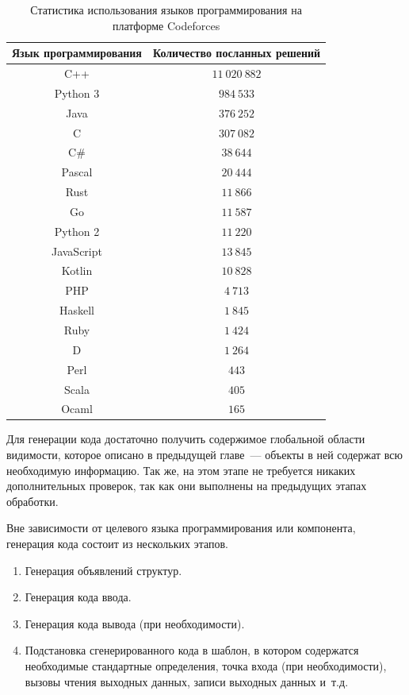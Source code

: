 \documentclass[times,specification,annotation]{style/itmo-student-thesis/itmo-student-thesis}
\begin{document}
\begin{table}[!h]
\caption{Статистика использования языков программирования на платформе Codeforces}\label{codeforces-langs}
\centering
\begin{tabular}{|*{2}{c|}}\hline
Язык программирования & Количество посланных решений \\\hline
C++         &   $11~020~882$ \\\hline
Python 3    &     $984~533$ \\\hline
Java        &     $376~252$ \\\hline
C           &     $307~082$ \\\hline
C\#         &      $38~644$ \\\hline
Pascal      &      $20~444$ \\\hline
Rust        &      $11~866$ \\\hline
Go          &      $11~587$ \\\hline
Python 2    &      $11~220$ \\\hline
JavaScript  &      $13~845$ \\\hline
Kotlin      &      $10~828$ \\\hline
PHP         &       $4~713$ \\\hline
Haskell     &       $1~845$ \\\hline
Ruby        &       $1~424$ \\\hline
D           &       $1~264$ \\\hline
Perl        &        $443$ \\\hline
Scala       &        $405$ \\\hline
Ocaml       &        $165$ \\\hline
\end{tabular}
\end{table}

Для генерации кода достаточно получить содержимое глобальной области видимости, которое описано в предыдущей главе~--- объекты в ней содержат всю необходимую информацию. Так же, на этом этапе не требуется никаких дополнительных проверок, так как они выполнены на предыдущих этапах обработки.

Вне зависимости от целевого языка программирования или компонента, генерация кода состоит из нескольких этапов.

\begin{enumerate}[leftmargin=1.75cm]
    \item Генерация объявлений структур.
    \item Генерация кода ввода.
    \item Генерация кода вывода (при необходимости).
    \item Подстановка сгенерированного кода в шаблон, в котором содержатся необходимые стандартные определения, точка входа (при необходимости), вызовы чтения выходных данных, записи выходных данных и~т.д.
\end{enumerate}
\end{document}
